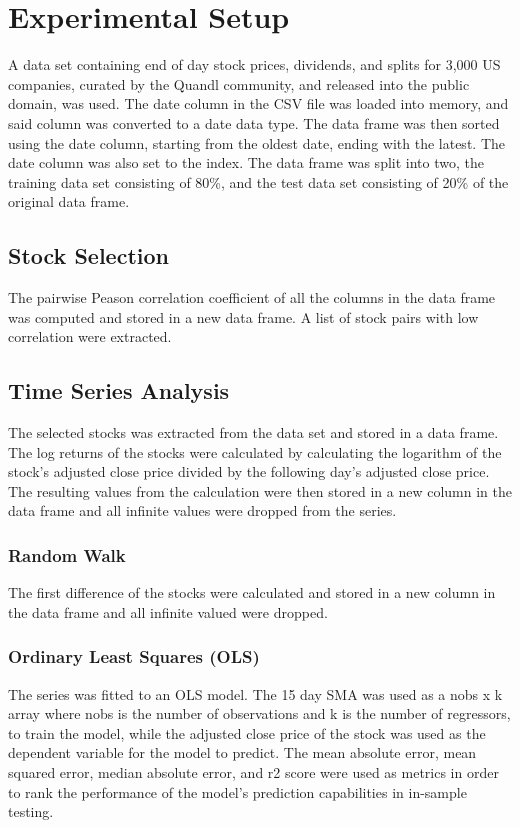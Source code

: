 \chapter{Experimental Setup}

A data set containing end of day stock prices, dividends, and splits for 3,000 US companies, curated by the Quandl community\cite{Quandl:2017aa}, and released into the public domain, was used. The date column in the CSV file was loaded into memory, and said column was converted to a date data type. The data frame was then sorted using the date column, starting from the oldest date, ending with the latest. The date column was also set to the index. The data frame was split into two, the training data set consisting of 80\%, and the test data set consisting of 20\% of the original data frame.

\section{Stock Selection}
The pairwise Peason correlation coefficient of all the columns in the data frame was computed and stored in a new data frame. A list of stock pairs with low correlation were extracted.

\section{Time Series Analysis}
The selected stocks was extracted from the data set and stored in a data frame. The log returns of the stocks were calculated by calculating the logarithm of the stock's adjusted close price divided by the following day's adjusted close price. The resulting values from the calculation were then stored in a new column in the data frame and all infinite values were dropped from the series.

\subsection{Random Walk}
The first difference of the stocks were calculated and stored in a new column in the data frame and all infinite valued were dropped.

\subsection{Ordinary Least Squares (OLS)}
The series was fitted to an OLS model. The 15 day SMA was used as a nobs x k array where nobs is the number of observations and k is the number of regressors, to train the model, while the adjusted close price of the stock was used as the dependent variable for the model to predict. The mean absolute error, mean squared error, median absolute error, and r2 score were used as metrics in order to rank the performance of the model's prediction capabilities in in-sample testing.

